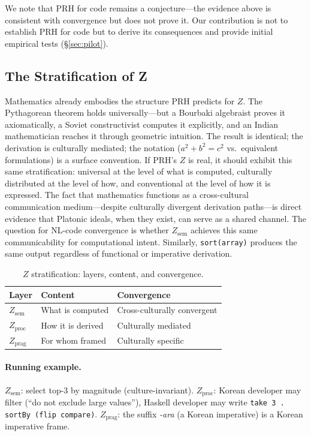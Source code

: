\documentclass[11pt]{article}
\theoremstyle{definition}
\newcommand{\Zsem}{Z_{\text{sem}}}
\newcommand{\Zproc}{Z_{\text{proc}}}
\newcommand{\Zprag}{Z_{\text{prag}}}
\begin{document}
We note that PRH for code remains a conjecture---the evidence above is consistent with convergence but does not prove it. Our contribution is not to establish PRH for code but to derive its consequences and provide initial empirical tests (\S\ref{sec:pilot}).

\subsection{The Stratification of Z}\label{sec:stratification}

Mathematics already embodies the structure PRH predicts for $Z$. The Pythagorean theorem holds universally---but a Bourbaki algebraist proves it axiomatically, a Soviet constructivist computes it explicitly, and an Indian mathematician reaches it through geometric intuition. The result is identical; the derivation is culturally mediated; the notation ($a^2 + b^2 = c^2$ vs.\ equivalent formulations) is a surface convention. If PRH's $Z$ is real, it should exhibit this same stratification: universal at the level of what is computed, culturally distributed at the level of how, and conventional at the level of how it is expressed. The fact that mathematics functions as a cross-cultural communication medium---despite culturally divergent derivation paths---is direct evidence that Platonic ideals, when they exist, can serve as a shared channel. The question for NL-code convergence is whether $\Zsem$ achieves this same communicability for computational intent. Similarly, \texttt{sort(array)} produces the same output regardless of functional or imperative derivation.

\begin{table}[t]
\centering
\caption{$Z$ stratification: layers, content, and convergence.}
\label{tab:stratification}
\small
\begin{tabular}{lll}
\toprule
\textbf{Layer} & \textbf{Content} & \textbf{Convergence} \\
\midrule
$\Zsem$ & What is computed & Cross-culturally convergent \\
$\Zproc$ & How it is derived & Culturally mediated \\
$\Zprag$ & For whom framed & Culturally specific \\
\bottomrule
\end{tabular}
\end{table}

\paragraph{Running example.}
$\Zsem$: select top-3 by magnitude (culture-invariant). $\Zproc$: Korean developer may filter (``do not exclude large values''), Haskell developer may write \texttt{take 3 . sortBy (flip compare)}. $\Zprag$: the suffix \emph{-ara} (a Korean imperative) is a Korean imperative frame.
\end{document}
